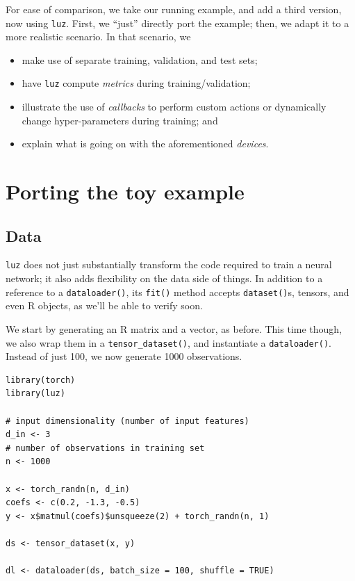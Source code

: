 \documentclass[
  letterpaper,
]{krantz}
\begin{document}
For ease of comparison, we take our running example, and add a third
version, now using \texttt{luz}. First, we ``just'' directly port the
example; then, we adapt it to a more realistic scenario. In that
scenario, we

\begin{itemize}
\item
  make use of separate training, validation, and test sets;
\item
  have \texttt{luz} compute \emph{metrics} during training/validation;
\item
  illustrate the use of \emph{callbacks} to perform custom actions or
  dynamically change hyper-parameters during training; and
\item
  explain what is going on with the aforementioned \emph{devices}.
\end{itemize}

\hypertarget{porting-the-toy-example}{%
\section{Porting the toy example}\label{porting-the-toy-example}}

\hypertarget{data-1}{%
\subsection{Data}\label{data-1}}

\texttt{luz} does not just substantially transform the code required to
train a neural network; it also adds flexibility on the data side of
things. In addition to a reference to a \texttt{dataloader()}, its
\texttt{fit()} method accepts \texttt{dataset()}s, tensors, and even R
objects, as we'll be able to verify soon.

We start by generating an R matrix and a vector, as before. This time
though, we also wrap them in a \texttt{tensor\_dataset()}, and
instantiate a \texttt{dataloader()}. Instead of just 100, we now
generate 1000 observations.

\begin{verbatim}
library(torch)
library(luz)

# input dimensionality (number of input features)
d_in <- 3
# number of observations in training set
n <- 1000

x <- torch_randn(n, d_in)
coefs <- c(0.2, -1.3, -0.5)
y <- x$matmul(coefs)$unsqueeze(2) + torch_randn(n, 1)

ds <- tensor_dataset(x, y)

dl <- dataloader(ds, batch_size = 100, shuffle = TRUE)
\end{verbatim}
\end{document}
